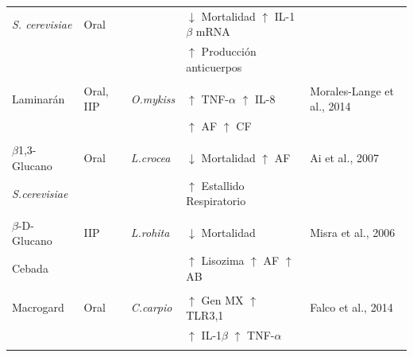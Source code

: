 \documentclass[12pt,letterpaper,oneside]{scrbook}
\begin{document}
\begin{table}[h!]
\begin{center}
\begin{threeparttable}
\begin{tabularx}{\textwidth}{l l l X l}
                \emph{S. cerevisiae}            &   Oral                &                               & $\downarrow$ Mortalidad $\uparrow$ IL-1$\beta$ mRNA           &                       \\
                                                &                       &                               & $\uparrow$ Producción anticuerpos &                       \\                                              
                & & & & \\
                Laminarán                       &   Oral, IIP           & \emph{O.mykiss}               & $\uparrow$ TNF-$\alpha$ $\uparrow$ IL-8           & Morales-Lange et al., 2014    \\
                                                &                       &                               & $\uparrow$ AF $\uparrow$ CF                   &                       \\
                & & & & \\
                $\beta$1,3-Glucano              &   Oral                & \emph{L.crocea}               & $\downarrow$ Mortalidad $\uparrow$ AF             & Ai et al., 2007               \\
                \emph{S.cerevisiae}             &                       &                               & $\uparrow$ Estallido Respiratorio                     &                       \\
                & & & & \\
                $\beta$-D-Glucano               &   IIP                 & \emph{L.rohita}               & $\downarrow$ Mortalidad           & Misra et al., 2006            \\
                Cebada                          &                       &                               & $\uparrow$ Lisozima $\uparrow$ AF $\uparrow$ AB               &                       \\
                & & & & \\
                Macrogard                       &   Oral                & \emph{C.carpio}               & $\uparrow$ Gen MX $\uparrow$ TLR3,1               & Falco et al., 2014            \\
                                                &                       &                               & $\uparrow$ IL-1$\beta$ $\uparrow$ TNF-$\alpha$            &                       \\
                & & & & \\

\end{tabularx}
\end{threeparttable}
\end{center}
\end{table}
\end{document}
